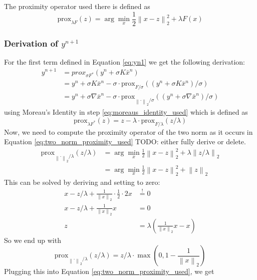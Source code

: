 \documentclass{paper}
\newcommand{\prox}{\text{prox}}
\newcommand{\twonorm}[1]{\left\lVert#1\right\rVert_2}
\begin{document}
The proximity operator used there is defined as 
\begin{equation}
	\prox_{\lambda F}(z) = \arg \min_x \frac{1}{2} \twonorm{x - z}^2 + \lambda F(x)
\end{equation}

\subsubsection*{Derivation of $y^{n+1}$}
For the first term defined in Equation \eqref{eq:yn1} we get the following derivation:
\begin{align}
	y^{n+1} &= prox_{\sigma F^*}(y^n + \sigma K \bar{x}^n) \\
			&= y^n + \sigma K \bar{x}^n - 
				\sigma \cdot \prox_{F / \sigma}((y^n + \sigma K \bar{x}^n) / \sigma) 
				\label{eq:moreaus_identity_used} \\
			&= y^n + \sigma \nabla \bar{x}^n - 
				\sigma \cdot \prox_{\twonorm{\cdot} / \sigma}((y^n + \sigma \nabla \bar{x}^n) / \sigma)
				\label{eq:two_norm_proximity_used}
\end{align}
using Moreau's Identity in step \eqref{eq:moreaus_identity_used} which is defined as
\begin{equation}
	\prox_{\lambda F^*}(z) = z - \lambda \cdot \prox_{F/ \lambda}(z / \lambda) 
\end{equation}
Now, we need to compute the proximity operator of the two norm as it 
occurs in Equation \eqref{eq:two_norm_proximity_used} TODO: either fully derive or delete.
\begin{align}
	\prox_{\twonorm{\cdot} / \lambda}(z / \lambda) &= \arg \min_x \frac{1}{2} \twonorm{x - z}^2 + \lambda \twonorm{z/\lambda} \\
	&= \arg \min_x \frac{1}{2} \twonorm{x - z}^2 + \twonorm{z}
\end{align}
This can be solved by deriving and setting to zero:
\begin{align*}
	x - z/\lambda + \frac{1}{\twonorm{x}} \cdot \frac{1}{2} \cdot 2x &\overset{!}{=} 0 \\
	x - z/\lambda + \frac{1}{\twonorm{x}} x &= 0 \\
	z &= \lambda(\frac{1}{\twonorm{x}} x - x)
\end{align*}
So we end up with
\begin{equation}
	\prox_{\twonorm{\cdot} / \lambda}(z / \lambda) =
	z / \lambda \cdot \max \left(0 , 1 - \frac{1}{\twonorm{x}} \right)
\end{equation}
Plugging this into Equation \eqref{eq:two_norm_proximity_used}, we get
\end{document}
